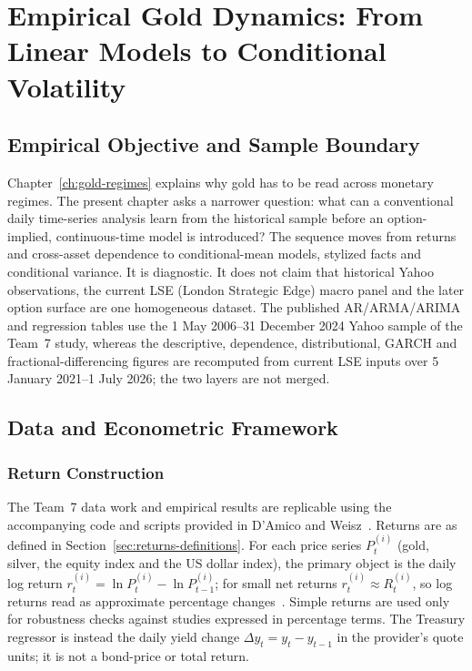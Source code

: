 \chapter{Empirical Gold Dynamics: From Linear Models to Conditional Volatility}
\label{ch:gold-econometrics}

\section{Empirical Objective and Sample Boundary}

Chapter~\ref{ch:gold-regimes} explains why gold has to be read across monetary regimes. The present
chapter asks a narrower question: what can a conventional daily time-series
analysis learn from the historical sample before an option-implied,
continuous-time model is introduced? The sequence moves from returns and
cross-asset dependence to conditional-mean models, stylized facts and
conditional variance. It is diagnostic. It does not claim that historical
Yahoo observations, the current LSE (London Strategic Edge) macro panel and the later option surface
are one homogeneous dataset. The published AR/ARMA/ARIMA and regression
tables use the 1 May 2006--31 December 2024 Yahoo sample of the Team~7 study,
whereas the descriptive, dependence, distributional, GARCH and
fractional-differencing figures are recomputed from current LSE inputs over 5 January 2021--1 July 2026; the two layers are
not merged.

\section{Data and Econometric Framework}
\subsection{Return Construction}

The Team~7 data work and empirical results are replicable using the
accompanying code and scripts provided in D'Amico and Weisz~\cite{team7-code}.
Returns are as defined in Section~\ref{sec:returns-definitions}. For each price
series $P^{(i)}_t$ (gold, silver, the equity index and the US dollar index), the
primary object is the daily log return
$r^{(i)}_t=\ln P^{(i)}_t-\ln P^{(i)}_{t-1}$; for small net returns
$r^{(i)}_t\approx R^{(i)}_t$, so log returns read as approximate percentage
changes~\cite{Tsay2010}. Simple returns are used only for robustness checks
against studies expressed in percentage terms. The Treasury regressor is
instead the daily yield change $\Delta y_t=y_t-y_{t-1}$ in the provider's
quote units; it is not a bond-price or total return.
